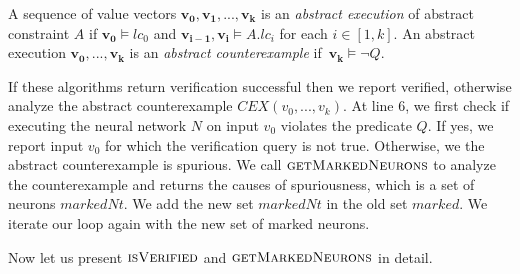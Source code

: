 \begin{df}
  A sequence of value vectors $\boldsymbol{v_0}, \boldsymbol{v_1}, ... , \boldsymbol{v_k}$ is an 
  {\em abstract execution} of abstract constraint $A$ if 
  $\boldsymbol{v_0} \models lc_0$ and $\boldsymbol{v_{i-1}}, \boldsymbol{v_i} \models A.lc_i$ for each $i \in [1,k]$.  
  An abstract execution $\boldsymbol{v_0,...,v_k}$ is
  an {\em abstract counterexample} if~$\boldsymbol{v_k} \models \lnot Q$.
\end{df}


If these algorithms return verification successful then we report verified,
otherwise analyze the abstract counterexample $CEX(v_0,...,v_k)$.
At line 6, we first check if executing the neural network $N$ on input $v_0$
violates the predicate $Q$.
If yes, we report input $v_0$ for which the verification query is not true.
Otherwise, we the abstract counterexample is spurious.
We call $\textsc{getMarkedNeurons}$ to analyze the counterexample and
returns the causes of spuriousness, which is a set of neurons $markedNt$.
We add the new set $markedNt$ in the old set $marked$.
We iterate our loop again with the new set of marked neurons.

Now let us present $\textsc{isVerified}$ and $\textsc{getMarkedNeurons}$ in detail.


%











